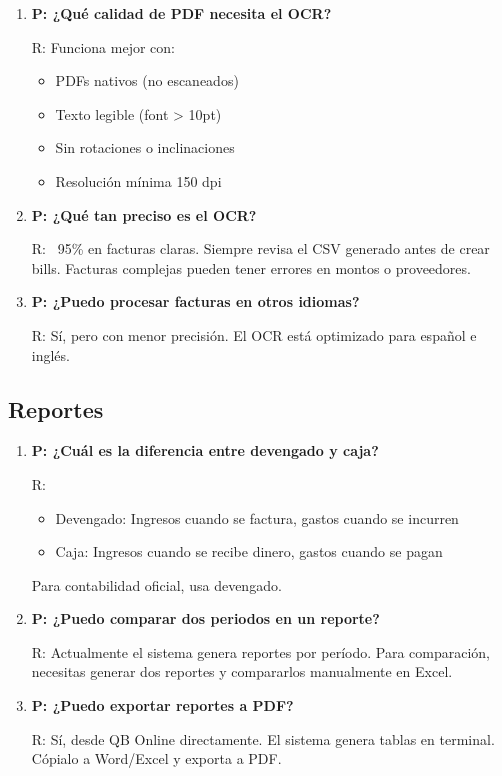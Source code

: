 \documentclass[12pt,oneside]{article}
\begin{document}
\begin{enumerate}
    \item \textbf{P: ¿Qué calidad de PDF necesita el OCR?}
    
    R: Funciona mejor con:
    \begin{itemize}
        \item PDFs nativos (no escaneados)
        \item Texto legible (font > 10pt)
        \item Sin rotaciones o inclinaciones
        \item Resolución mínima 150 dpi
    \end{itemize}
    
    \item \textbf{P: ¿Qué tan preciso es el OCR?}
    
    R: ~95\% en facturas claras. Siempre revisa el CSV generado antes de crear bills. Facturas complejas pueden tener errores en montos o proveedores.
    
    \item \textbf{P: ¿Puedo procesar facturas en otros idiomas?}
    
    R: Sí, pero con menor precisión. El OCR está optimizado para español e inglés.
    
\end{enumerate}

\subsection{Reportes}

\begin{enumerate}
    \item \textbf{P: ¿Cuál es la diferencia entre devengado y caja?}
    
    R: 
    \begin{itemize}
        \item Devengado: Ingresos cuando se factura, gastos cuando se incurren
        \item Caja: Ingresos cuando se recibe dinero, gastos cuando se pagan
    \end{itemize}
    Para contabilidad oficial, usa devengado.
    
    \item \textbf{P: ¿Puedo comparar dos periodos en un reporte?}
    
    R: Actualmente el sistema genera reportes por período. Para comparación, necesitas generar dos reportes y compararlos manualmente en Excel.
    
    \item \textbf{P: ¿Puedo exportar reportes a PDF?}
    
    R: Sí, desde QB Online directamente. El sistema genera tablas en terminal. Cópialo a Word/Excel y exporta a PDF.
    
\end{enumerate}
\end{document}
